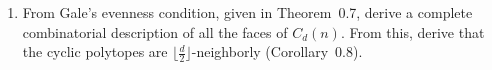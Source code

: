 \documentclass{article}
\begin{document}
\begin{enumerate}
\begin{solution}
The affine transformation induces a pairing of faces, with the only (non-trivial) exception as the vertex $\textbf{x}(\frac{n}{2})$ when $n$ is even.

\end{solution}
\item From Gale's evenness condition, given in Theorem~0.7, derive a complete combinatorial description of all the faces of $C_d(n)$. From this, derive that the cyclic polytopes are $\bigl\lfloor \tfrac{d}{2} \bigr\rfloor$-neighborly (Corollary~0.8).


\end{enumerate}
\end{document}

